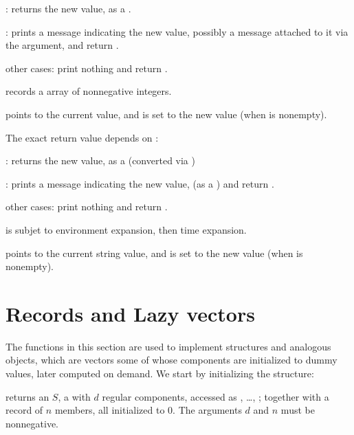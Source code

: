 \item {}: returns the new value, as a .

\item {}: prints a message indicating the new value,
possibly a message attached to it via the  argument, and return
.

\item other cases: print nothing and return .


\item records a  array of nonnegative integers.

\item {} points to the current  value, and is set to the
new value (when  is nonempty).

The exact return value depends on :

\item {}: returns the new value, as a  (converted via
)

\item {}: prints a message indicating the new value,
(as a ) and return .

\item other cases: print nothing and return .

\item {} is subjet to environment expansion, then time expansion.

\item {} points to the current string value, and is set to the new
value (when  is nonempty).

\section{Records and Lazy vectors}
The functions in this section are used to implement  structures and
analogous objects, which are vectors some of whose components are initialized
to dummy values, later computed on demand. We start by initializing the
structure:

 returns an  $S$, a 
with $d$ regular components, accessed as , \dots,
; together with a record of $n$ members, all initialized to
$0$. The arguments $d$ and $n$ must be nonnegative.

